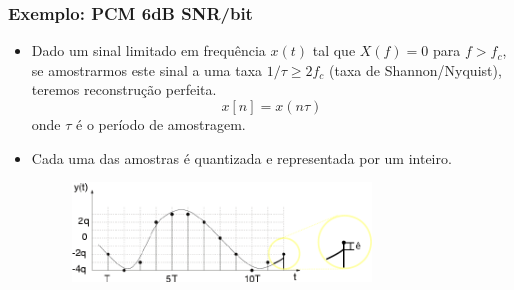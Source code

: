 \begin{frame}[allowframebreaks]
  \frametitle{Exemplo: PCM 6dB SNR/bit}

  \begin{itemize}
  \item Dado um sinal limitado em frequência $x(t)$ tal que $X(f) = 0$ para $f > f_c$,
	se amostrarmos este sinal a uma taxa $1/\tau \geq 2 f_c$ (taxa de Shannon/Nyquist),
	teremos reconstrução perfeita.
	\begin{equation}
	x[n] = x(n \tau)
	\end{equation}
	onde $\tau$ é o período de amostragem.
  \item Cada uma das amostras é quantizada e representada por um inteiro.

  \begin{figure}[h!]
  \centering
  \includegraphics[width=0.75\textwidth]{images/sampling.pdf}
  \label{fig:sampling}
  \end{figure}


\end{itemize}
\end{frame}
